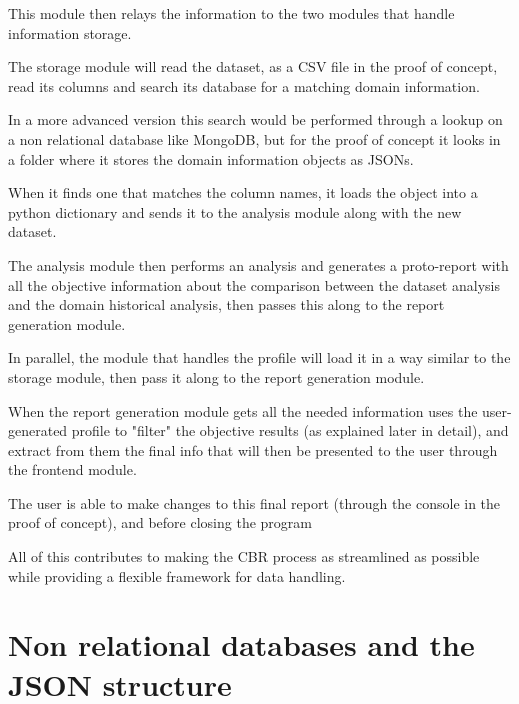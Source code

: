 This module then relays the information to the two modules that handle information storage. 

The storage module will read the dataset, as a CSV file in the proof of concept, read its columns and search its database for a matching domain information.

In a more advanced version this search would be performed through a lookup on a non relational database like MongoDB, but for the proof of concept it looks in a folder where it stores the domain information objects as JSONs.

When it finds one that matches the column names, it loads the object into a python dictionary and sends it to the analysis module along with the new dataset.

The analysis module then performs an analysis and generates a proto-report with all the objective information about the comparison between the dataset analysis and the domain historical analysis, then passes this along to the report generation module.

In parallel, the module that handles the profile will load it in a way similar to the storage module, then pass it along to the report generation module.

When the report generation module gets all the needed information uses the user-generated profile to "filter" the objective results (as explained later in detail), and extract from them the final info that will then be presented to the user through the frontend module.

The user is able to make changes to this final report (through the console in the proof of concept), and before closing the program

All of this contributes to making the CBR process as streamlined as possible while providing a flexible framework for data handling.

\begin{figure}[!htb]
    \caption{\label{fig:info_flow}}
\end{figure}

\section{Non relational databases and the JSON structure}
\label{cap3:sec:jsonfiller}

